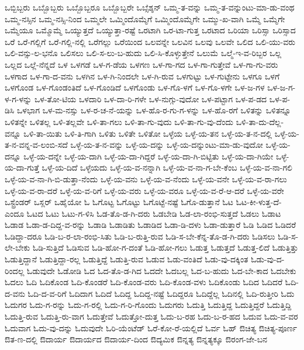 {ಒಬ್ಬಿಬ್ಬರು
ಒಬ್ಬೊಬ್ಬರು
ಒಬ್ಬೊಬ್ಬರೂ
ಒಬ್ಬೊಬ್ಬರೇ
ಒಬ್ಸೆಶ್ಶನ್
ಒಮ್ಮ-ತ-ವನ್ನು
ಒಮ್ಮ-ತ-ವನ್ನುಂಟು-ಮಾ-ಡು-ವಂಥ
ಒಮ್ಮ-ನಸ್ಸಿನ
ಒಮ್ಮ-ನಸ್ಸಿ-ನಿಂದ
ಒಮ್ಮಲೇ
ಒಮ್ಮಿಂದೊಮ್ಮೆಗೆ
ಒಮ್ಮಿಂದೊಮ್ಮೆಗೇ
ಒಮ್ಮು-ಖ-ವಾಗಿ
ಒಮ್ಮೆ
ಒಮ್ಮೆಗೇ
ಒಮ್ಮೆಯೂ
ಒಮ್ಮೊಮ್ಮೆ
ಒಯ್ಯುತ್ತದೆ
ಒಯ್ಯುತ್ತಾ-ರಷ್ಟೆ
ಒರಟಾಗಿ
ಒರ-ಟಾ-ಗುತ್ತ
ಒರಟಾದ
ಒರಿಯಾ
ಒರಿಸ್ಸಾ
ಒರಿಸ್ಸಾದ
ಒರೆ
ಒರೆ-ಗಲ್ಲಿಗೆ
ಒರೆ-ಗಲ್ಲಿ-ನಲ್ಲಿ
ಒರೆಗಲ್ಲು
ಒರೆಯಿಂದ
ಒಲವನ್ನೇ
ಒಲವಿನ
ಒಲವು
ಒಲವೇ
ಒಲಿದ
ಒಲಿ-ಯು-ವರು
ಒಲಿ-ವನ್ಸು-ಲ-ಭನೊ
ಒಲಿಸಲು
ಒಲಿ-ಸ-ಲು-ಬ-ಹುದು
ಒಲಿ-ಸಿ-ಕೊಳ್ಳುತ್ತೇನೆ
ಒಲುಮೆ
ಒಲ್ಮೆ-ಇ-ವ-ರಿಬ್ಬರ
ಒಲ್ಲ
ಒಲ್ಲದ
ಒಲ್ಲೆ-ನೆನ್ನದೆ
ಒಳ
ಒಳಗಡೆ
ಒಳ-ಗ-ಡೆಯ
ಒಳಗಣ
ಒಳ-ಗಾ-ಗದ
ಒಳ-ಗಾ-ಗುತ್ತೇವೆ
ಒಳ-ಗಾ-ಗು-ವರು
ಒಳಗಾದ
ಒಳ-ಗಾ-ದ-ವನು
ಒಳಗಿನ
ಒಳ-ಗಿ-ನಿಂದಲೇ
ಒಳ-ಗಿ-ರುವ
ಒಳಗುಟ್ಟು
ಒಳ-ಗುಟ್ಟೇನು
ಒಳಗೂ
ಒಳಗೆ
ಒಳಗೊಂಡ
ಒಳ-ಗೊಂಡಂತಿದೆ
ಒಳ-ಗೊಂಡಿದೆ
ಒಳಗೊಂಡು
ಒಳ-ಗೊ-ಳಗೆ
ಒಳ-ಗೊ-ಳಗೇ
ಒಳ-ಜ-ಗಳ
ಒಳ-ಜ-ಗ-ಳ-ಗ-ಳನ್ನು
ಒಳ-ತೋ-ಟಿಯ
ಒಳದಾರಿ
ಒಳ-ದಾ-ರಿ-ಗಳೇ
ಒಳ-ನುಗ್ಗು-ವುದೋ
ಒಳ-ಪಟ್ಟಾಗ
ಒಳ-ಪ-ಡದ
ಒಳ-ಪ-ಡಿಸಿ
ಒಳಭಾಗ
ಒಳ-ಮ-ನಸ್ಸು
ಒಳ-ರ-ಚ-ನೆ-ಯನ್ನು
ಒಳ-ಹೊ-ರ-ಗು-ಗ-ಳನ್ನು
ಒಳ-ಹೊ-ರಗೆ
ಒಳಿತನ್ನು
ಒಳಿತನ್ನೂ
ಒಳಿತನ್ನೇ
ಒಳಿತಲ್ಲ
ಒಳಿ-ತಲ್ಲವೇ
ಒಳಿ-ತಾ-ಗಲು
ಒಳಿ-ತಾ-ಗು-ವುದು
ಒಳಿ-ತಾ-ಗು-ವು-ದೆಂದು
ಒಳಿ-ತಾ-ದು-ದೆಲ್ಲ-ವನ್ನೂ
ಒಳಿ-ತಾ-ಯಿತು
ಒಳಿ-ತಿ-ಗಾಗಿ
ಒಳಿತು
ಒಳಿತೇ
ಒಳಿತೋ
ಒಳ್ಳೆಯ
ಒಳ್ಳೆ-ಯ-ತನ
ಒಳ್ಳೆ-ಯ-ತ-ನ-ದಲ್ಲಿ
ಒಳ್ಳೆ-ಯ-ತ-ನ-ವನ್ನ-ವ-ಲಂಬಿ-ಸದೆ
ಒಳ್ಳೆ-ಯ-ತ-ನ-ವನ್ನು
ಒಳ್ಳೆ-ಯ-ದನ್ನು
ಒಳ್ಳೆ-ಯ-ದನ್ನುಂಟು-ಮಾ-ಡು-ವುದೋ
ಒಳ್ಳೆ-ಯ-ದನ್ನೂ
ಒಳ್ಳೆ-ಯ-ದನ್ನೇ
ಒಳ್ಳೆ-ಯ-ದಾಗಿ
ಒಳ್ಳೆ-ಯ-ದಾ-ಗಿದ್ದರೆ
ಒಳ್ಳೆ-ಯ-ದಾ-ಗಿ-ಬಿಟ್ಟಿತು
ಒಳ್ಳೆ-ಯ-ದಾ-ಗಿಯೇ
ಒಳ್ಳೆ-ಯ-ದಾ-ಗುತ್ತೆ
ಒಳ್ಳೆ-ಯ-ದಿದೆ
ಒಳ್ಳೆಯದು
ಒಳ್ಳೆ-ಯ-ವ-ನನ್ನಾಗಿ
ಒಳ್ಳೆ-ಯ-ವ-ನಾ-ಗ-ಬೇ-ಕೆಂಬ
ಒಳ್ಳೆ-ಯ-ವ-ನಾ-ಗಲಿ
ಒಳ್ಳೆ-ಯ-ವ-ನಾ-ಗಿ-ಬಿ-ಡುತ್ತಾ-ನೆಂದು
ಒಳ್ಳೆ-ಯ-ವನು
ಒಳ್ಳೆ-ಯ-ವ-ನೆಂದು
ಒಳ್ಳೆ-ಯ-ವನೇ
ಒಳ್ಳೆ-ಯ-ವ-ರಾ-ಗಲು
ಒಳ್ಳೆ-ಯ-ವ-ರಾ-ದರೆ
ಒಳ್ಳೆ-ಯ-ವ-ರಿಗೆ
ಒಳ್ಳೆ-ಯ-ವರು
ಒಳ್ಳೆ-ಯ-ವರೂ
ಒಳ್ಳೆ-ಯ-ವ-ರೆ-ಆ-ದರೆ
ಒಳ್ಳೆ-ಯ-ವರೇ
ಒಸ್ಟ್ರೆಂಡರ್
ಒಸ್ಲರ್
ಒಹೈಯೋ
ಓ
ಓಗೊಟ್ಟ
ಓಗೊಟ್ಟು
ಓಗೊಟ್ಟೆ-ನಷ್ಟೆ
ಓಗೊ-ಡುತ್ತಾನೆ
ಓಟ
ಓಟ-ಕೀ-ಳುತ್ತ-ದೆ-ಎಂದೂ
ಓಟದ
ಓಟು
ಓಟು-ಗ-ಳಿಸಿ
ಓಡ-ತೊ-ಡ-ಗಿ-ದರು
ಓಡಬೇಡಿ
ಓಡ-ಲಾ-ರಂಭಿ-ಸುತ್ತದೆ
ಓಡಲು
ಓಡಾಟ
ಓಡಾಡ
ಓಡಾ-ಡ-ದಿದ್ದ-ವ-ರನ್ನು
ಓಡಾಡಿ
ಓಡಾಡಿತು
ಓಡಾಡಿದ
ಓಡಾ-ಡಿ-ದಳು
ಓಡಾ-ಡುತ್ತಾರೆ
ಓಡಿ
ಓಡಿದ
ಓಡಿದರೆ
ಓಡಿದ್ದಾ-ದರೂ
ಓಡಿ-ಬ-ರ-ಲಾ-ರಂಭಿ-ಸಿತು
ಓಡಿ-ಬ-ರುತ್ತಿ-ರುವ
ಓಡಿ-ಸ-ಬೇ-ಕೆನ್ನ-ತೊ-ಡ-ಗಿ-ದರು
ಓಡಿಸಲು
ಓಡಿ-ಸ-ಲೇ-ಬೇಕು
ಓಡಿ-ಸುತ್ತಿದೆ
ಓಡಿಸುವ
ಓಡಿ-ಹೋ-ಗ-ದಂತೆ
ಓಡಿ-ಹೋ-ಗಲು
ಓಡುತ್ತ
ಓಡುತ್ತದೆ
ಓಡುತ್ತ-ಲಿದೆ
ಓಡುತ್ತಿತ್ತು
ಓಡುತ್ತಿದ್ದಾನೆ
ಓಡುತ್ತಿದ್ದಾ-ರಲ್ಲ
ಓಡುತ್ತಿದ್ದೆ
ಓಡುತ್ತಿ-ರುವ
ಓಡುವ
ಓಡು-ವಂತಿದೆ
ಓಡು-ವು-ದಕ್ಕಿಂತ
ಓಡು-ವು-ದ-ರಿಂದಲ್ಲ
ಓಡುವುದೇ
ಓಡೋಡಿ
ಓದ
ಓದ-ತೊ-ಡ-ಗಿದ
ಓದದೇ
ಓದಬಲ್ಲ
ಓದ-ಬ-ಹುದು
ಓದ-ಬೇ-ಕಾದ
ಓದಬೇಕು
ಓದಲು
ಓದಿ
ಓದಿಕೊಂಡ
ಓದಿ-ಕೊಂಡರೆ
ಓದಿ-ಕೊಂಡ-ವರು
ಓದಿ-ಕೊಂಡ-ವಳು
ಓದಿಕೊಂಡು
ಓದಿದ
ಓದಿದರೆ
ಓದಿ-ದ-ವನು
ಓದಿ-ದ-ವ-ರಿಗೆ
ಓದಿದಾಗ
ಓದಿದೆ
ಓದಿದ್ದ
ಓದಿದ್ದ-ನಷ್ಟೆ
ಓದಿದ್ದರೂ
ಓದಿದ್ದೆಲ್ಲ
ಓದಿನಲ್ಲಿ
ಓದಿ-ರುತ್ತೀರಿ
ಓದು
ಓದುಗರ
ಓದು-ಗ-ರನ್ನು
ಓದು-ಗ-ರಲ್ಲಿ
ಓದು-ಗ-ರಿ-ಗೊಂದು
ಓದುಗರು
ಓದುತ್ತಿ
ಓದುತ್ತಿದ್ದ
ಓದುತ್ತಿದ್ದರೆ
ಓದುತ್ತಿದ್ದಿ
ಓದುತ್ತಿ-ರುವ
ಓದುತ್ತಿ-ರು-ವಾಗ
ಓದುತ್ತೇವೆ
ಓದುತ್ತೋ-ದುತ್ತ
ಓದು-ಬ-ರಹ
ಓದು-ಬ-ರ-ಹದ
ಓದುವ
ಓದು-ವ-ವರ
ಓದುವಾಗ
ಓದು-ವು-ದನ್ನು
ಓದುವುದೇ
ಓರಿ-ಯೆಂಟೆಡ್
ಓರೆ-ಕೋ-ರೆ-ಯಲ್ಲಿದೆ
ಓರ್ವ
ಓಹ್
ಔಚಿತ್ಯ
ಔಚಿತ್ಯ-ಪೂರ್ಣ
ಔತ-ಣ-ದಲ್ಲಿ
ಔದಾರ್ಯ
ಔದಾರ್ಯದ
ಔದಾರ್ಯ-ದಿಂದ
ಔದ್ಯಮಿಕ
ಔನ್ನತ್ಯ
ಔನ್ನತ್ಯಕ್ಕೂ
ಔರಂಗ-ಜೇ-ಬನ
}
